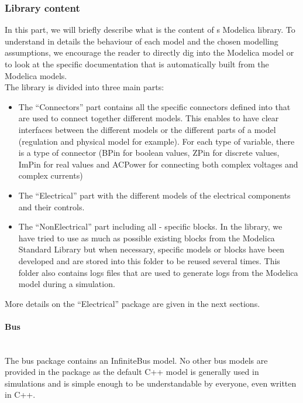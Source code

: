 \documentclass[a4paper, 12pt]{report}
\begin{document}
\subsubsection{Library content}

In this part, we will briefly describe what is the content of \Dynawo\textquotesingle s Modelica library. To understand in details the behaviour of each model and the chosen modelling assumptions, we encourage the reader to directly dig into the Modelica  model or to look at the specific documentation that is automatically built from the Modelica models. \\

The \Dynawo library is divided into three main parts:
\begin{itemize}
\item The ``Connectors'' part contains all the specific connectors defined into \Dynawo that are used to connect together different models. This enables to have clear interfaces between the different models or the different parts of a model (regulation and physical model for example). For each type of variable, there is a type of connector (BPin for boolean values, ZPin for discrete values, ImPin for real values and ACPower for connecting both complex voltages and complex currents)
\item The ``Electrical'' part with the different models of the electrical components and their controls.
\item The ``NonElectrical'' part including all \Dynawo - specific blocks. In the library, we have tried to use as much as possible existing blocks from the Modelica Standard Library but when necessary, specific models or blocks have been developed and are stored into this folder to be reused several times. This folder also contains logs files that are used to generate logs from the Modelica model during a simulation.
\end{itemize}

More details on the ``Electrical'' package are given in the next sections.

\paragraph{Bus}
~~\\

The bus package contains an InfiniteBus model. No other bus models are provided in the package as the default C++ model is generally used in \Dynawo simulations and is simple enough to be understandable by everyone, even written in C++.
\end{document}
